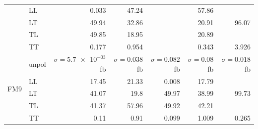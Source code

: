 \begin{table}[h]
{\begin{tabular}{llrrrrr}
 & LL & \num{0.033} & \num{47.24} &  & \num{57.86} &  \\
 & LT & \num{49.94} & \num{32.86} &  & \num{20.91} & \num{96.07} \\
 & TL & \num{49.85} & \num{18.95} &  & \num{20.89} &  \\
 & TT & \num{0.177} & \num{0.954} &  & \num{0.343} & \num{3.926} \\
\midrule
\multirow{5}{*}{FM9}
 & unpol & $\sigma = \num{5.7e-03}$ fb & $\sigma = \num{0.038}$ fb & $\sigma = \num{0.082}$ fb & $\sigma = \num{0.08}$ fb & $\sigma = \num{0.018}$ fb \\
 & LL & \num{17.45} & \num{21.33} & \num{0.008} & \num{17.79} &  \\
 & LT & \num{41.07} & \num{19.8} & \num{49.97} & \num{38.99} & \num{99.73} \\
 & TL & \num{41.37} & \num{57.96} & \num{49.92} & \num{42.21} &  \\
 & TT & \num{0.11} & \num{0.91} & \num{0.099} & \num{1.009} & \num{0.265} \\
\bottomrule
\end{tabular}
}%
\end{table}
\newpage
